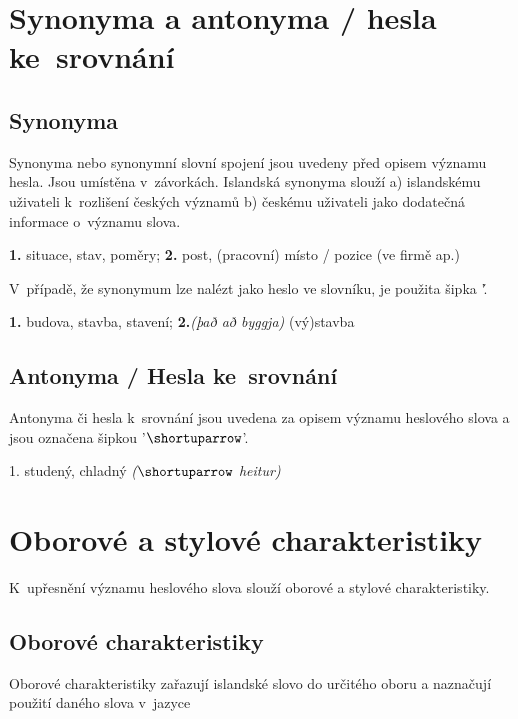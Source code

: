 \section{Synonyma a antonyma / hesla ke~srovnání}
\longsectionskip

\subsection*{Synonyma}

Synonyma nebo synonymní slovní spojení jsou uvedeny před opisem významu hesla. Jsou umístěna v~závorkách. Islandská synonyma slouží a) islandskému uživateli k~rozlišení českých významů b) českému uživateli jako dodatečná informace o~významu slova.

\blspace
  \dicEntry {}   {\textbf{1.}}  {situace, stav, poměry;} {\textbf{2.}}  {post, (pracovní) místo / pozice (ve firmě ap.)}
\blspace

V~případě, že synonymum lze nalézt jako heslo ve slovníku, je použita šipka '\dicsymSee\'.

\blspace
  \dicEntry {} {  {\textbf{1.}}  {budova, stavba, stavení;} {\textbf{2.}}\textit{(það að byggja)} {(vý)stavba} }
\blspace

\subsection*{Antonyma / Hesla ke~srovnání}

Antonyma či hesla k~srovnání jsou uvedena za opisem významu heslového slova a jsou označena šipkou '$\shortuparrow$'.

\blspace
  \dicEntry {}   {1.} {studený, chladný} \textit{($\shortuparrow$ heitur)}
\blspace

\section{Oborové a stylové charakteristiky}

K~upřesnění významu heslového slova slouží oborové a stylové charakteristiky.

\subsection*{Oborové charakteristiky}

Oborové charakteristiky zařazují islandské slovo do určitého oboru a naznačují použití daného slova v~jazyce

